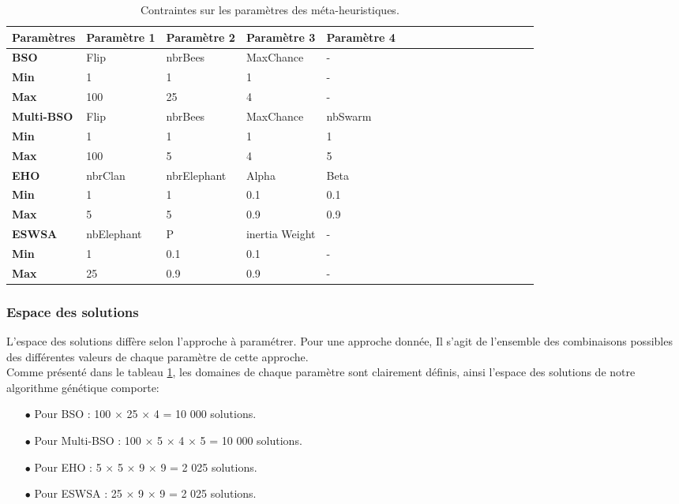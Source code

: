 \begin{table}[h]
	\centering
	\begin{tabular}{lllllllllllllllll} 
		\textbf{Paramètres} &  \textbf{Paramètre 1} &
		\textbf{Paramètre 2} & \textbf{Paramètre 3} & \textbf{Paramètre 4}\\ 
		\hline
		\textbf{BSO} & Flip & nbrBees & MaxChance &  -\\ 
		\hline
		\textbf{Min} & 1 & 1 & 1 &  -  \\ 
		\hline
		\textbf{Max} & 100 & 25 & 4 &  - \\
		\hline
		\hline
		\textbf{Multi-BSO} & Flip & nbrBees & MaxChance &  nbSwarm\\ 
		\hline
		\textbf{Min} & 1 & 1 & 1 & 1  \\ 
		\hline
		\textbf{Max} & 100 & 5 & 4 & 5 \\
		\hline
		\hline
		\textbf{EHO} & nbrClan & nbrElephant & Alpha &  Beta\\ 
		\hline
		\textbf{Min} & 1 & 1 & 0.1 & 0.1  \\ 
		\hline
		\textbf{Max} & 5 & 5 & 0.9 & 0.9 \\
		\hline
		\hline
		\textbf{ESWSA} & nbElephant & P & inertia Weight &   - \\ 
		\hline
		\textbf{Min} & 1 & 0.1 & 0.1 & -  \\ 
		\hline
		\textbf{Max} & 25 & 0.9 & 0.9 & - \\
		\hline
	\end{tabular}
	\captionsetup{width=1\linewidth}
	\caption{Contraintes sur les paramètres des méta-heuristiques.}
	\label{ContrGA}
\end{table}






\subsubsection{Espace des solutions}
L’espace des solutions diffère selon l'approche à paramétrer. Pour une approche donnée, Il s'agit de l’ensemble des combinaisons possibles des différentes valeurs de chaque paramètre de cette approche.\\
Comme présenté dans le tableau \ref{ContrGA}, les domaines de chaque paramètre sont clairement définis, ainsi l'espace des solutions de notre algorithme génétique comporte:

\begin{itemize}
	\item[$\bullet$] Pour BSO : 100 $\times$ 25 $\times$ 4 = 10 000 solutions.
	\item[$\bullet$] Pour Multi-BSO : 100 $\times$ 5 $\times$ 4 $\times$ 5 = 10 000 solutions.
	\item[$\bullet$] Pour EHO : 5 $\times$ 5 $\times$ 9 $\times$ 9 = 2 025 solutions.
	\item[$\bullet$] Pour ESWSA : 25 $\times$ 9 $\times$ 9 = 2 025 solutions.
\end{itemize}

